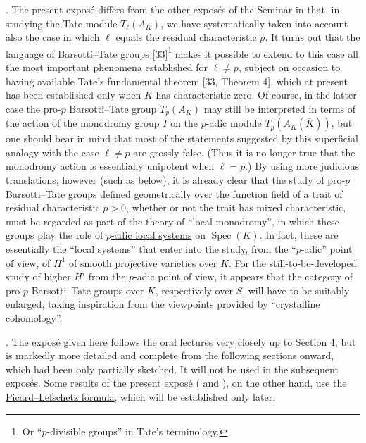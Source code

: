 . The present expos\'e differs from the other expos\'es of the
Seminar in that, in studying the Tate module $T_\ell(A_K)$, we have
systematically taken into account also the case in which $\ell$ equals
the residual characteristic $p$. It turns out that the language of
\underline{Barsotti--Tate groups} [33]\footnote{Or ``$p$-divisible
groups'' in Tate's terminology.} makes it possible to extend to this
case all the most important phenomena established for $\ell\ne p$,
subject on occasion to having available Tate's fundamental theorem
[33, Theorem 4], which at present has been established only when $K$
has characteristic zero. Of course, in the latter case the pro-$p$
Barsotti--Tate group $T_p(A_K)$ may still be interpreted in terms of
the action of the monodromy group $I$ on the $p$-adic module
$T_p(A_K(\overline K))$, but one should bear in mind that most of the
statements suggested by this superficial analogy with the case
$\ell\ne p$ are grossly false. (Thus it is no longer true that the
monodromy action is essentially unipotent when $\ell=p$.) By using more
judicious translations, however (such as  below), it is already
clear that the study of pro-$p$ Barsotti--Tate groups defined
geometrically over the function field of a trait of residual
characteristic $p>0$, whether or not the trait has mixed
characteristic, must be regarded as part of the theory of ``local
monodromy'', in which these groups play the role of \underline{$p$-adic
local systems} on $\operatorname{Spec}(K)$. In fact, these are
essentially the ``local systems'' that enter into the \underline{study,
from the ``$p$-adic'' point of view, of $H^1$ of smooth projective
varieties over} $K$. For the still-to-be-developed study of higher
$H^i$ from the $p$-adic point of view, it appears that the category of
pro-$p$ Barsotti--Tate groups over $K$, respectively over $S$, will
have to be suitably enlarged, taking inspiration from the viewpoints
provided by ``crystalline cohomology''.

. The expos\'e given here follows the oral lectures very closely up
to Section 4, but is markedly more detailed and complete from the
following sections onward, which had been only partially sketched. It
will not be used in the subsequent expos\'es. Some results of the
present expos\'e ( and ), on the other hand, use the
\underline{Picard--Lefschetz formula}, which will be established only
later.


